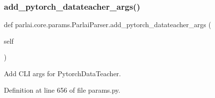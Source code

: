 \subsubsection{\texorpdfstring{add\+\_\+pytorch\+\_\+datateacher\+\_\+args()}{add\_pytorch\_datateacher\_args()}}
{\footnotesize\ttfamily def parlai.\+core.\+params.\+Parlai\+Parser.\+add\+\_\+pytorch\+\_\+datateacher\+\_\+args (\begin{DoxyParamCaption}\item[{}]{self }\end{DoxyParamCaption})}

\begin{DoxyVerb}Add CLI args for PytorchDataTeacher.
\end{DoxyVerb}
 

Definition at line 656 of file params.\+py.


